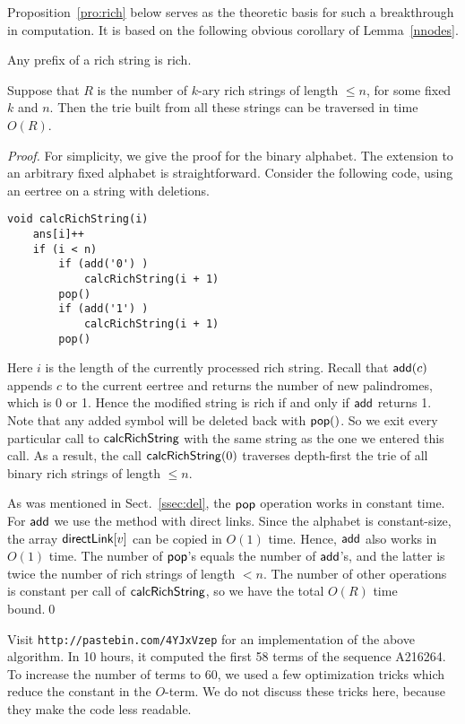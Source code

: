 \documentclass{llncs}
\def\add{{\sf add}}
\def\pop{{\sf pop}}
\def\direct{{\sf directLink}}
\begin{document}
Proposition~\ref{pro:rich} below serves as the theoretic basis for such a breakthrough in computation. It is based on the following obvious corollary of Lemma~\ref{nnodes}.

\begin{lemma}\label{rich}
Any prefix of a rich string is rich.
\end{lemma}

\begin{proposition} \label{pro:rich}
Suppose that $R$ is the number of $k$-ary rich strings of length $\le n$, for some fixed $k$ and $n$. Then the trie built from all these strings can be traversed in time $O(R)$. 
\end{proposition}

\begin{proof}
For simplicity, we give the proof for the binary alphabet. The extension to an arbitrary fixed alphabet is straightforward. Consider the following code, using an eertree on a string with deletions.

\begin{lstlisting}
void calcRichString(i) 
	ans[i]++
	if (i < n)
		if (add('0') )
			calcRichString(i + 1)
		pop()
		if (add('1') )
			calcRichString(i + 1)
		pop()
\end{lstlisting}

Here $i$ is the length of the currently processed rich string. Recall that $\add(c)$ appends $c$ to the current eertree and returns the number of new palindromes, which is 0 or 1. Hence the modified string is rich if and only if $\add$ returns 1. Note that any added symbol will be deleted back with $\pop()$. So we exit every particular call to ${\sf calcRichString}$ with the same string as the one we entered this call. As a result, the call ${\sf calcRichString}(0)$ traverses depth-first the trie of all binary rich strings of length $\le n$. 

As was mentioned in Sect.~\ref{ssec:del}, the $\pop$ operation works in constant time. For $\add$ we use the method with direct links. Since the alphabet is constant-size, the array $\direct[v]$ can be copied in $O(1)$ time. Hence, $\add$ also works in $O(1)$ time. The number of $\pop$'s equals the number of $\add$'s, and the latter is twice the number of rich strings of length $<n$. The number of other operations is constant per call of ${\sf calcRichString}$, so we have the total $O(R)$ time bound.\qed 
\end{proof}

\begin{remark}
Visit \texttt{http://pastebin.com/4YJxVzep} for an implementation of the above algorithm. In 10 hours, it computed the first 58 terms of the sequence A216264. To increase the number of terms to 60, we used a few optimization tricks which reduce the constant in the $O$-term. We do not discuss these tricks here, because they make the code less readable.
\end{remark}
\end{document}
